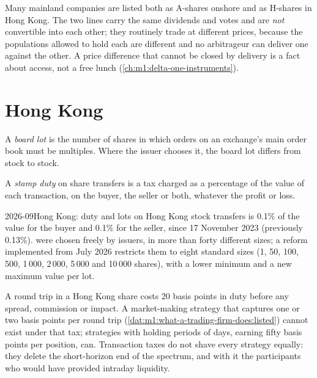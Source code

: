\begin{remark}\label{rem:m1:asian-and-emerging-equity-markets:ah}
Many mainland companies are listed both as A-shares onshore and as H-shares
in Hong Kong. The two lines carry the same dividends and votes and are
\emph{not} convertible into each other; they routinely trade at different
prices, because the populations allowed to hold each are different and no
arbitrageur can deliver one against the other. A price difference that cannot
be closed by delivery is a fact about access, not a free lunch
(\cref{ch:m1:delta-one-instruments}).
\end{remark}

\section{Hong Kong}

\begin{definition}\label{def:m1:asian-and-emerging-equity-markets:lot}
A \emph{board lot} is the number of shares in which orders
on an exchange's main order book must be multiples. Where the issuer chooses
it, the board lot differs from stock to stock.
\end{definition}

\begin{definition}\label{def:m1:asian-and-emerging-equity-markets:stamp}
A \emph{stamp duty} on share transfers is a tax charged as a
percentage of the value of each transaction, on the buyer, the seller or
both, whatever the profit or loss.
\end{definition}

\begin{dated}{2026-09}{Hong Kong: duty and lots}\label{dat:m1:asian-and-emerging-equity-markets:hk}
 on Hong Kong stock transfers is 0.1\% of the value for the buyer
and 0.1\% for the seller, since 17 November 2023 (previously 0.13\%).  were chosen freely by issuers, in more than forty different sizes; a
reform implemented from July 2026 restricts them to eight standard sizes (1,
50, 100, 500, 1\,000, 2\,000, 5\,000 and 10\,000 shares), with a lower minimum
and a new maximum value per lot.
\end{dated}

\begin{example}\label{ex:m1:asian-and-emerging-equity-markets:duty}
A round trip in a Hong Kong share costs 20 basis points in duty before any
spread, commission or impact. A market-making strategy that captures one or
two basis points per round trip
(\cref{dat:m1:what-a-trading-firm-does:listed}) cannot exist under that tax;
strategies with holding periods of days, earning fifty basis points per
position, can. Transaction taxes do not shave every strategy equally: they
delete the short-horizon end of the spectrum, and with it the participants
who would have provided intraday liquidity.
\end{example}

